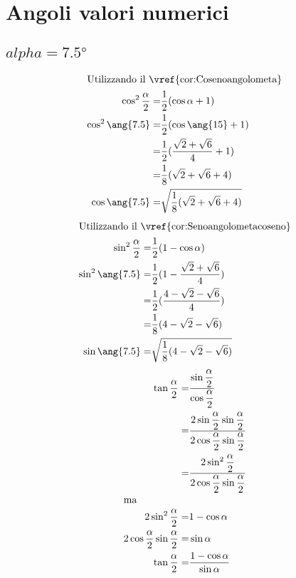 \chapter{Angoli valori numerici}\label{chap:Angoli_valori_numerici}
\section{$alpha=\ang{7.5}$}
\begin{align*}
	\intertext{Utilizzando il~\vref{cor:Cosenoangolometa}}
	\cos^2\dfrac{\alpha}{2}=&\dfrac{1}{2}(\cos\alpha+1)\\
	\cos^2\ang{7.5}=&\dfrac{1}{2}(\cos\ang{15}+1)\\ 
	=&\dfrac{1}{2}(\dfrac{\sqrt{2}+\sqrt{6}}{4}+1)\\
	=&\dfrac{1}{8}(\sqrt{2}+\sqrt{6}+4)\\
	\cos\ang{7.5}=&\sqrt{\dfrac{1}{8}(\sqrt{2}+\sqrt{6}+4)}\\
\end{align*}
\begin{align*}
\intertext{Utilizzando il~\vref{cor:Senoangolometacoseno}}
\sin^2\dfrac{\alpha}{2}=&\dfrac{1}{2}(1-\cos\alpha)\\ 
\sin^2\ang{7.5}=&\dfrac{1}{2}(1-\dfrac{\sqrt{2}+\sqrt{6}}{4})\\ 
=&\dfrac{1}{2}(\dfrac{4-\sqrt{2}-\sqrt{6}}{4})\\ 
=&\dfrac{1}{8}(4-\sqrt{2}-\sqrt{6})\\ 
\sin\ang{7.5}=&\sqrt{\dfrac{1}{8}(4-\sqrt{2}-\sqrt{6})}
\end{align*}
\begin{align*}
	\tan\dfrac{\alpha}{2}=&\dfrac{\sin\dfrac{\alpha}{2}}{\cos\dfrac{\alpha}{2}}\\
	=&\dfrac{2\sin\dfrac{\alpha}{2}\sin\dfrac{\alpha}{2}}{2\cos\dfrac{\alpha}{2}\sin\dfrac{\alpha}{2}}\\
	=&\dfrac{2\sin^2\dfrac{\alpha}{2}}{2\cos\dfrac{\alpha}{2}\sin\dfrac{\alpha}{2}}\\
	\intertext{ma}
	2\sin^2\dfrac{\alpha}{2}=&1-\cos\alpha\\
	2\cos\dfrac{\alpha}{2}\sin\dfrac{\alpha}{2}=&\sin\alpha\\
	\tan\dfrac{\alpha}{2}=&\dfrac{1-\cos\alpha}{\sin\alpha}\\
\end{align*}
